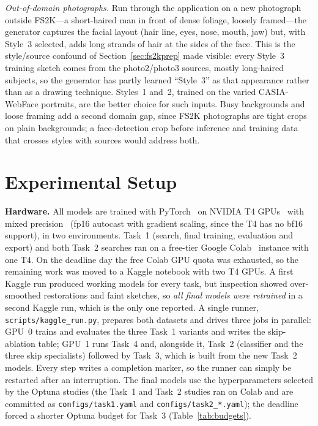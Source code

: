 \documentclass[conference]{IEEEtran}
\begin{document}
\emph{Out-of-domain photographs.} Run through the application on a new photograph
outside FS2K---a short-haired man in front of dense foliage, loosely framed---the
generator captures the facial layout (hair line, eyes, nose, mouth, jaw) but, with
Style~3 selected, adds long strands of hair at the sides of the face. This is the
style/source confound of Section~\ref{sec:fs2kprep} made visible: every Style~3
training sketch comes from the photo2/photo3 sources, mostly long-haired subjects,
so the generator has partly learned ``Style~3'' as that appearance rather than as a
drawing technique. Styles~1 and~2, trained on the varied CASIA-WebFace portraits,
are the better choice for such inputs. Busy backgrounds and loose framing add a
second domain gap, since FS2K photographs are tight crops on plain backgrounds; a
face-detection crop before inference and training data that crosses styles with
sources would address both.

\section{Experimental Setup}
\label{sec:setup}

\textbf{Hardware.} All models are trained with PyTorch~\cite{paszke2019pytorch} on
NVIDIA T4 GPUs~\cite{nvidiat4} with mixed precision~\cite{micikevicius2018mixed}
(fp16 autocast with gradient scaling, since the T4 has no bf16 support), in two
environments. Task~1 (search, final training, evaluation and export) and both
Task~2 searches ran on a free-tier Google Colab~\cite{colab} instance with one
T4. On the deadline day the free Colab GPU quota was exhausted, so the remaining
work was moved to a Kaggle notebook with two T4 GPUs. A first Kaggle run produced
working models for every task, but inspection showed over-smoothed restorations and
faint sketches, so \emph{all final models were retrained} in a second Kaggle run,
which is the only one reported. A single runner, \texttt{scripts/kaggle\_run.py},
prepares both datasets and drives three jobs in parallel: GPU~0 trains and
evaluates the three Task~1 variants and writes the skip-ablation table; GPU~1 runs
Task~4 and, alongside it, Task~2 (classifier and the three skip specialists)
followed by Task~3, which is built from the new Task~2 models. Every step writes a
completion marker, so the runner can simply be restarted after an interruption.
The final models use the hyperparameters selected by the Optuna studies (the
Task~1 and Task~2 studies ran on Colab and are committed as
\texttt{configs/task1.yaml} and \texttt{configs/task2\_*.yaml}); the deadline
forced a shorter Optuna budget for Task~3 (Table~\ref{tab:budgets}).
\end{document}

